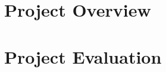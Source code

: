 \chapter{Project Overview}\label{CAP:ProjectOverview}


\chapter{Project Evaluation}\label{CAP:ProjectEvaluation}

